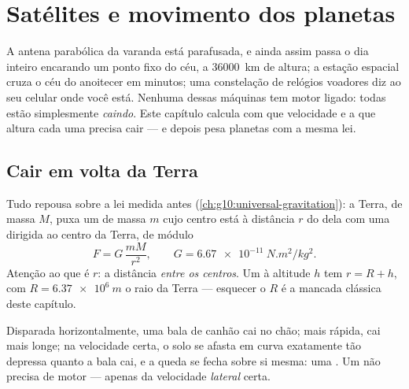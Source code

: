 \chapter{Satélites e movimento dos planetas}\label{ch:g12:satellites-kepler}

A antena parabólica da varanda está parafusada, e ainda assim passa o dia inteiro
encarando um ponto fixo do céu, a \qty{36000}{km} de altura; a estação espacial cruza
o céu do anoitecer em minutos; uma constelação de relógios voadores diz ao seu celular
onde você está. Nenhuma dessas máquinas tem motor ligado: todas estão simplesmente
\emph{caindo}. Este capítulo calcula com que velocidade e a que altura cada uma
precisa cair --- e depois pesa planetas com a mesma lei.

\section{Cair em volta da Terra}

Tudo repousa sobre a lei medida antes (\cref{ch:g10:universal-gravitation}): a Terra,
de massa $M$, puxa um  de massa $m$ cujo centro está à distância $r$ do dela
com uma  dirigida ao centro da Terra, de módulo
\[ F = G\,\frac{m M}{r^2}, \qquad G = \qty{6.67e-11}{N.m^2/kg^2}. \]
Atenção ao que é $r$: a distância \emph{entre os centros}. Um  à altitude $h$
tem $r = R + h$, com $R = \qty{6.37e6}{m}$ o raio da Terra --- esquecer o $R$ é a
mancada clássica deste capítulo.

\begin{remark}\label{rem:g12:satellites-kepler:cannon}
Disparada horizontalmente, uma bala de canhão cai no chão; mais rápida, cai mais
longe; na velocidade certa, o solo se afasta em curva exatamente tão depressa quanto a
bala cai, e a queda se fecha sobre si mesma: uma . Um  não precisa de
motor --- apenas da velocidade \emph{lateral} certa.
\end{remark}

